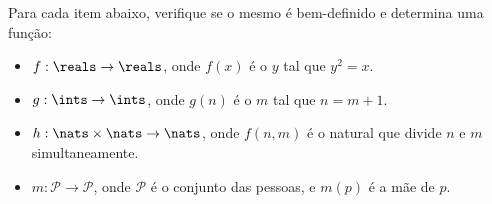 \begin{exercise}
Para cada item abaixo, verifique se o mesmo é bem-definido e determina uma função:
\begin{itemize}
  \item $f : \reals \rightarrow \reals$, onde $f(x)$ é o $y$ tal que $y^2 = x$.
  \item $g : \ints \rightarrow \ints$, onde $g(n)$ é o $m$ tal que $n = m + 1$.
  \item $h : \nats \times \nats \rightarrow \nats$, onde $f(n,m)$ é o natural que divide $n$ e $m$ simultaneamente.
  \item $m : \mathcal{P} \rightarrow \mathcal{P}$, onde $\mathcal{P}$ é o conjunto das pessoas, e $m(p)$ é a mãe de $p$.
\end{itemize}
\end{exercise}
